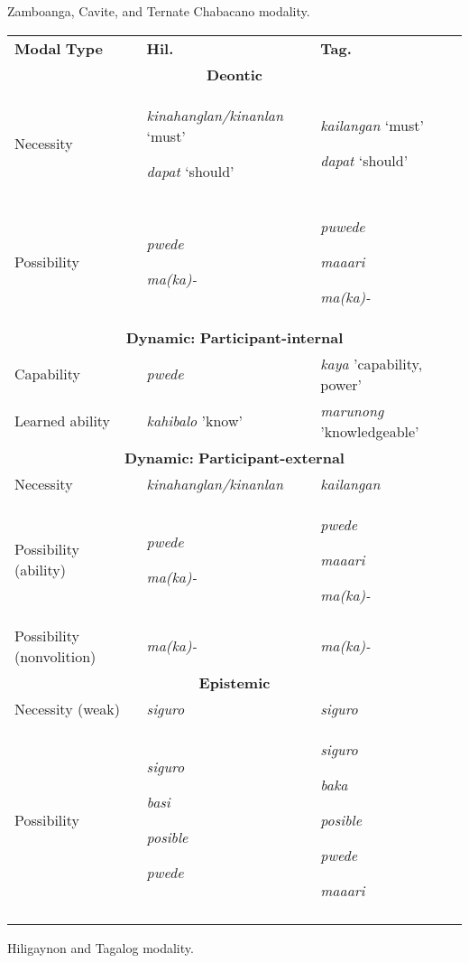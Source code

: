 \begin{table}
\caption{Zamboanga, Cavite, and Ternate Chabacano modality.}
\label{tab:key:2}
\end{table}


\begin{tabularx}{\textwidth}{XXX}

\lsptoprule

\textbf{Modal} \textbf{Type} & \textbf{Hil.} & \textbf{Tag.}\\
\multicolumn{3}{c}{\textbf{Deontic}}\\
Necessity & \textit{kinahanglan/kinanlan} ‘must’

\textit{dapat} ‘should’ & \textit{kailangan} ‘must’

\textit{dapat} ‘should’\\
Possibility & \textit{pwede}

\textit{ma(ka)-} & \textit{puwede}

\textit{maaari}

\textit{ma(ka)-}\\
\multicolumn{3}{c}{\textbf{Dynamic:} \textbf{Participant-internal}}\\
Capability & \textit{pwede} & \textit{kaya} 'capability, power'\\
Learned ability & \textit{kahibalo} 'know' & \textit{marunong} 'knowledgeable'\\
\multicolumn{3}{c}{\textbf{Dynamic:} \textbf{Participant-external}}\\
Necessity & \textit{kinahanglan/kinanlan} & \textit{kailangan}\\
Possibility (ability) & \textit{pwede}

\textit{ma(ka)-} & \textit{pwede}

\textit{maaari}

\textit{ma(ka)-}\\
Possibility (nonvolition) & \textit{ma(ka)-} & \textit{ma(ka)-}\\
\multicolumn{3}{c}{\textbf{Epistemic}}\\
Necessity (weak) & \textit{siguro} & \textit{siguro} \\
Possibility & \textit{siguro}

\textit{basi} 

\textit{posible}

\textit{pwede} & \textit{siguro}

\textit{baka} 

\textit{posible}

\textit{pwede}

\textit{maaari}\\
\lspbottomrule
\end{tabularx}
\begin{table}
\caption{Hiligaynon and Tagalog modality.}
\label{tab:key:3}
\end{table}

